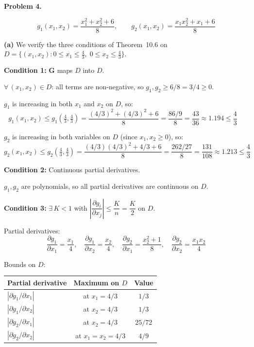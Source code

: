 \documentclass[12pt,letterpaper]{article}
\begin{document}

\textbf{Problem 4.}

\[
g_1(x_1, x_2) = \frac{x_1^2 + x_2^2 + 6}{8}, \qquad
g_2(x_1, x_2) = \frac{x_1 x_2^2 + x_1 + 6}{8}
\]

\textbf{(a)} We verify the three conditions of Theorem~10.6 on $D = \{(x_1, x_2) : 0 \le x_1 \le \tfrac{4}{3},\; 0 \le x_2 \le \tfrac{4}{3}\}$.

\textbf{Condition 1:} $\mathbf{G}$ maps $D$ into $D$.

$\forall\, (x_1, x_2) \in D$: all terms are non-negative, so $g_1, g_2 \ge 6/8 = 3/4 \ge 0$.

$g_1$ is increasing in both $x_1$ and $x_2$ on $D$, so:
\[
g_1(x_1, x_2) \le g_1\!\left(\tfrac{4}{3}, \tfrac{4}{3}\right) = \frac{(4/3)^2 + (4/3)^2 + 6}{8} = \frac{86/9}{8} = \frac{43}{36} \approx 1.194 \le \frac{4}{3} \quad \]

$g_2$ is increasing in both variables on $D$ (since $x_1, x_2 \ge 0$), so:
\[
g_2(x_1, x_2) \le g_2\!\left(\tfrac{4}{3}, \tfrac{4}{3}\right) = \frac{(4/3)(4/3)^2 + 4/3 + 6}{8} = \frac{262/27}{8} = \frac{131}{108} \approx 1.213 \le \frac{4}{3} \quad \]

\textbf{Condition 2:} Continuous partial derivatives.

$g_1, g_2$ are polynomials, so all partial derivatives are continuous on $D$. 

\textbf{Condition 3:} $\exists\, K < 1$ with $\left|\dfrac{\partial g_i}{\partial x_j}\right| \le \dfrac{K}{n} = \dfrac{K}{2}$ on $D$.

Partial derivatives:
\[
\frac{\partial g_1}{\partial x_1} = \frac{x_1}{4}, \quad
\frac{\partial g_1}{\partial x_2} = \frac{x_2}{4}, \quad
\frac{\partial g_2}{\partial x_1} = \frac{x_2^2 + 1}{8}, \quad
\frac{\partial g_2}{\partial x_2} = \frac{x_1 x_2}{4}
\]

Bounds on $D$:
\begin{center}
\begin{tabular}{lcc}
\toprule
Partial derivative & Maximum on $D$ & Value \\
\midrule
$|\partial g_1/\partial x_1|$ & at $x_1 = 4/3$ & $1/3$ \\
$|\partial g_1/\partial x_2|$ & at $x_2 = 4/3$ & $1/3$ \\
$|\partial g_2/\partial x_1|$ & at $x_2 = 4/3$ & $25/72$ \\
$|\partial g_2/\partial x_2|$ & at $x_1 = x_2 = 4/3$ & $4/9$ \\
\bottomrule
\end{tabular}
\end{center}
\end{document}
